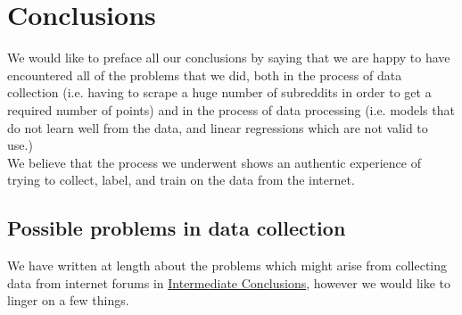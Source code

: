 \documentclass[11pt, oneside]{article}   	%
\begin{document}
\section{Conclusions}
We would like to preface all our conclusions by saying that we are happy to have encountered all of the problems that we did, both in the process of data collection (i.e. having to scrape a huge number of subreddits in order to get a required number of points) and in the process of data processing (i.e. models that do not learn well from the data, and linear regressions which are not valid to use.)\\
We believe that the process we underwent shows an authentic experience of trying to collect, label, and train on the data from the internet.
\subsection{Possible problems in data collection}
We have written at length about the problems which might arise from collecting data from internet forums in \hyperref[sec:inter_conclusions]{Intermediate Conclusions}, however we would like to linger on a few things.\\
\end{document}
